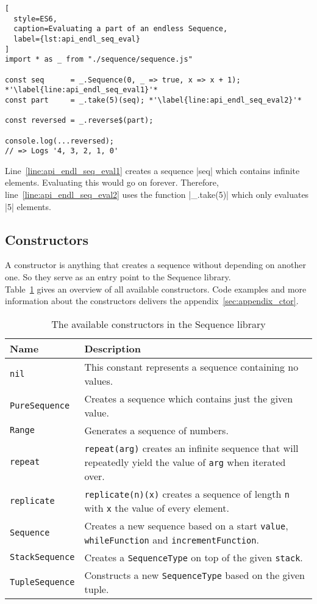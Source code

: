 \begin{lstlisting}[
  style=ES6,
  caption=Evaluating a part of an endless Sequence,
  label={lst:api_endl_seq_eval}
]
import * as _ from "./sequence/sequence.js"

const seq      = _.Sequence(0, _ => true, x => x + 1); *'\label{line:api_endl_seq_eval1}'*
const part     = _.take(5)(seq); *'\label{line:api_endl_seq_eval2}'*

const reversed = _.reverse$(part);

console.log(...reversed);
// => Logs '4, 3, 2, 1, 0'
\end{lstlisting}

Line~\ref{line:api_endl_seq_eval1} creates a sequence |seq| which contains
infinite elements. Evaluating this would go on forever. Therefore,
line~\ref{line:api_endl_seq_eval2} uses the function |_.take(5)| which only
evaluates |5| elements.

\subsection{Constructors} %
\label{sub:api_Constructors}
A constructor is anything that creates a sequence without depending on another
one. So they serve as an entry point to the Sequence library. \\
Table~\ref{tab:api_ctors} gives an overview of all available constructors. Code
examples and more information about the constructors delivers the
appendix~\ref{sec:appendix_ctor}.

\begin{table}[H]
  \centering
  \begin{tabularx}{\textwidth}{| l | X |} \hline
    \textbf{Name} & \textbf{Description} \\ \hline
    \texttt{nil} & This constant represents a sequence containing no values. \\ \hline
    \texttt{PureSequence} & Creates a sequence which contains just the given value. \\ \hline
    \texttt{Range} & Generates a sequence of numbers. \cite{wild_ip5_2023} \\ \hline
    \texttt{repeat} & \texttt{repeat(arg)} creates an infinite sequence that will repeatedly yield the value of \texttt{arg} when iterated over. \\ \hline
    \texttt{replicate} & \texttt{replicate(n)(x)} creates a sequence of length \texttt{n} with \texttt{x} the value of every element. \\ \hline
    \texttt{Sequence} & Creates a new sequence based on a start \texttt{value}, \texttt{whileFunction} and \texttt{incrementFunction}. \\ \hline
    \texttt{StackSequence} & Creates a \texttt{SequenceType} on top of the given \texttt{stack}. \\ \hline
    \texttt{TupleSequence} & Constructs a new \texttt{SequenceType} based on the given tuple. \\ \hline
  \end{tabularx}
  \caption{The available constructors in the Sequence library}
  \label{tab:api_ctors}
\end{table}

